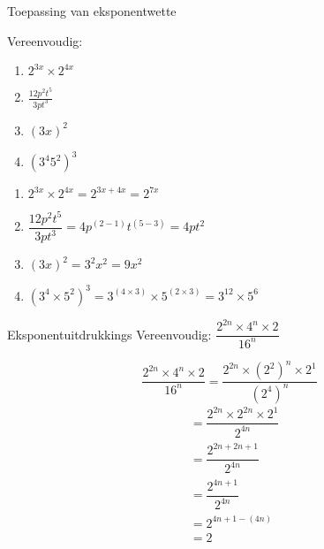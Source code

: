 \begin{wex}
{ %
Toepassing van eksponentwette
}
{%
Vereenvoudig:
\begin{enumerate}[itemsep=6pt, label=\textbf{\arabic*}.]
\item  $2^{3x} \times 2^{4x}$
\item $\frac{12p^2t^5}{3pt^3}$
\item $ (3x)^2 $
\item $(3^4 5^2)^3$
\end{enumerate}
}
{%
\begin{minipage}{\textwidth}
\begin{enumerate}[itemsep=6pt, label=\textbf{\arabic*}.]
\item  $2^{3x} \times 2^{4x} = 2^{3x+4x} = 2^{7x}$
 \item $\dfrac{12p^2t^5}{3pt^3} = 4p^{(2-1)}t^{(5-3)} = 4pt^2$
 \item $ (3x)^2 = 3^2x^2 = 9x^2$
 \item $(3^4\times5^2)^3 = 3^{(4\times3)}\times5^{(2\times3)} = 3^{12}\times5^6 $
\end{enumerate}
\end{minipage}
}
\end{wex}


\begin{wex}
{
Eksponentuitdrukkings
}
{
Vereenvoudig: $\dfrac{2^{2n} \times 4^n \times 2}{16^n}$
}
{

\begin{equation*}
  \dfrac{2^{2n} \times 4^n \times 2}{16^n} = \dfrac{2^{2n} \times (2^2)^n \times 2^1}{(2^4)^n} 
\end{equation*}
\begin{align*}
  &= \dfrac{2^{2n} \times 2^{2n} \times 2^1}{2^{4n}} \\
  &= \dfrac{2^{2n + 2n +1}}{2^{4n}} \\
  &= \dfrac{2^{4n+1}}{2^{4n}} \\
  &= 2^{4n+1-(4n)} \\
  &= 2
\end{align*}
}
\end{wex}


